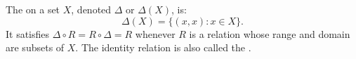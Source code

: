 The  on a set $X$, denoted $\Delta$ or $\Delta(X)$, is:
$$
\Delta(X) = \{(x,x): x \in X\}.
$$
It satisfies $\Delta \circ R = R \circ \Delta = R$ whenever $R$ is a relation whose range and domain are subsets of $X$. The identity relation is also called the .
